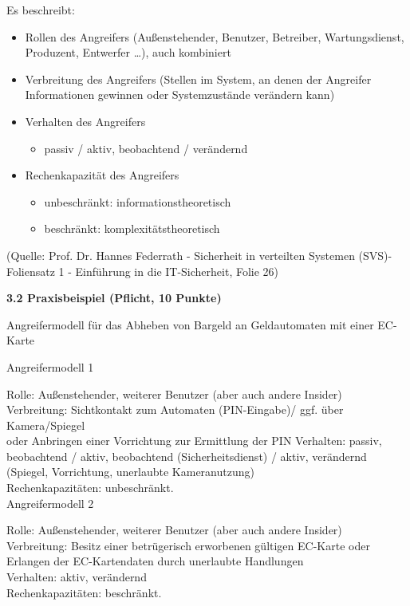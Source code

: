 \documentclass[ngerman]{fbi-aufgabenblatt}
\begin{document}
Es beschreibt:
\begin{itemize}
\item Rollen des Angreifers (Außenstehender, Benutzer, Betreiber,
Wartungsdienst, Produzent, Entwerfer …), auch kombiniert
\item Verbreitung des Angreifers (Stellen im System, an denen der
Angreifer Informationen gewinnen oder Systemzustände verändern kann)\\
\item Verhalten des Angreifers
	\begin{itemize}
   \item passiv / aktiv, beobachtend / verändernd
   \end{itemize}
\item Rechenkapazität des Angreifers
	\begin{itemize}
   \item unbeschränkt: informationstheoretisch
   \item beschränkt: komplexitätstheoretisch
   \end{itemize}
\end{itemize}

(Quelle: Prof. Dr. Hannes Federrath - Sicherheit in verteilten Systemen (SVS)-Foliensatz 1 - \dq Einführung in die IT-Sicherheit\dq , Folie 26)

\textbf{3.2 Praxisbeispiel (Pflicht, 10 Punkte)}

Angreifermodell für das Abheben von
Bargeld an Geldautomaten mit einer EC-Karte


Angreifermodell 1

Rolle: Außenstehender, weiterer Benutzer (aber auch andere Insider) \\
Verbreitung: Sichtkontakt zum Automaten (PIN-Eingabe)/ ggf. über Kamera/Spiegel \\
	oder Anbringen einer Vorrichtung zur Ermittlung der PIN 
Verhalten: passiv, beobachtend / aktiv, beobachtend (Sicherheitsdienst)  / aktiv, verändernd (Spiegel, Vorrichtung, unerlaubte Kameranutzung)\\
Rechenkapazitäten: unbeschränkt. \\

Angreifermodell 2

Rolle: Außenstehender, weiterer Benutzer (aber auch andere Insider) \\
Verbreitung: Besitz einer betrügerisch erworbenen gültigen EC-Karte oder Erlangen der EC-Kartendaten durch unerlaubte Handlungen \\
Verhalten: aktiv, verändernd \\
Rechenkapazitäten: beschränkt.   
\end{document}
